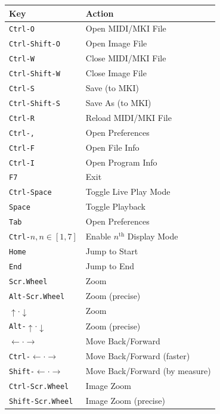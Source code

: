 \documentclass[english]{article}
\makeatletter
\newenvironment{restoretext}%
    {\@parboxrestore%
     \begin{adjustwidth}{}{\leftmargin}%
    }{\end{adjustwidth}
     }
\def\rcbegin{\begin{restoretext}\centering}
\def\rcend{\end{restoretext}}
\providecommand{\mi}[1]{\texttt{#1}}
\makeatother
\begin{document}
\vspace{1em}

\rcbegin
\begin{tabular}{|l|l|}
  \hline
  \textbf{Key}                 														& \textbf{Action} \\
  \hline
  \mi{Ctrl-O}       					 														& Open MIDI/MKI File \\
  \mi{Ctrl-Shift-O} 					 														& Open Image File \\
  \mi{Ctrl-W}       					 														& Close MIDI/MKI File \\
  \mi{Ctrl-Shift-W} 					 														& Close Image File \\
  \mi{Ctrl-S}       					 														& Save (to MKI) \\
  \mi{Ctrl-Shift-S} 					 														& Save As (to MKI) \\
  \mi{Ctrl-R}       					 														& Reload MIDI/MKI File \\
  \mi{Ctrl-,}       					 														& Open Preferences \\
  \mi{Ctrl-F}       					 														& Open File Info \\
  \mi{Ctrl-I}       					 														& Open Program Info \\
  \mi{F7}       					     														& Exit \\
  \mi{Ctrl-Space}   					 														& Toggle Live Play Mode \\
  \mi{Space}   					 														      & Toggle Playback \\
  \mi{Tab}   					 														          & Open Preferences \\
  \mi{Ctrl-}$n, n \in [1,7]$   														& Enable $n^\text{th}$ Display Mode\\
  \mi{Home}   					 														      & Jump to Start \\
  \mi{End}   					 														        & Jump to End \\
  \mi{Scr.Wheel}       			 										  				& Zoom \\
  \mi{Alt-Scr.Wheel}       			 										  		& Zoom (precise) \\
  $\uparrow \cdot \downarrow$       			                & Zoom \\
  \mi{Alt-}$\uparrow \cdot \downarrow$       			        & Zoom (precise) \\
  $\leftarrow \cdot \rightarrow$       			              & Move Back/Forward \\
  \mi{Ctrl-}$\leftarrow \cdot \rightarrow$       			    & Move Back/Forward (faster) \\
  \mi{Shift-}$\leftarrow \cdot \rightarrow$       			  & Move Back/Forward (by measure) \\
  \mi{Ctrl-Scr.Wheel}       			 										  	& Image Zoom \\
  \mi{Shift-Scr.Wheel}       			 										  	& Image Zoom (precise) \\
  \hline
\end{tabular}
\rcend
\end{document}
